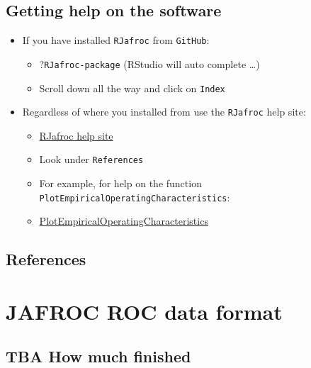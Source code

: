 \documentclass[
]{book}
\providecommand{\tightlist}{%
  \setlength{\itemsep}{0pt}\setlength{\parskip}{0pt}}
\begin{document}
\hypertarget{quick-start-help-getting-help}{%
\section{Getting help on the software}\label{quick-start-help-getting-help}}

\begin{itemize}
\tightlist
\item
  If you have installed \texttt{RJafroc} from \texttt{GitHub}:

  \begin{itemize}
  \tightlist
  \item
    ?\texttt{RJafroc-package} (RStudio will auto complete \ldots)
  \item
    Scroll down all the way and click on \texttt{Index}
  \end{itemize}
\item
  Regardless of where you installed from use the \texttt{RJafroc} help site:

  \begin{itemize}
  \tightlist
  \item
    \href{https://dpc10ster.github.io/RJafroc/}{RJafroc help site}
  \item
    Look under \texttt{References}
  \item
    For example, for help on the function \texttt{PlotEmpiricalOperatingCharacteristics}:
  \item
    \href{https://dpc10ster.github.io/RJafroc/reference/PlotEmpiricalOperatingCharacteristics.html}{PlotEmpiricalOperatingCharacteristics}
  \end{itemize}
\end{itemize}

\hypertarget{quick-start-help-references}{%
\section{References}\label{quick-start-help-references}}

\hypertarget{quick-start-data-format}{%
\chapter{JAFROC ROC data format}\label{quick-start-data-format}}

\hypertarget{quick-start-data-format-how-much-finished}{%
\section{TBA How much finished}\label{quick-start-data-format-how-much-finished}}
\end{document}
